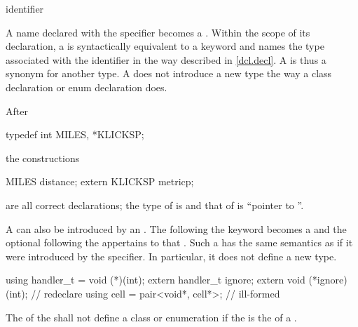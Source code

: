 \begin{bnf}
\br
    identifier
\end{bnf}

A name declared with the  specifier becomes a
. Within the scope of its declaration, a
 is syntactically equivalent to a keyword and
names the type associated with the identifier in the way described in
\ref{dcl.decl}.
%
%
%
A  is thus a synonym for another type. A
 does not introduce a new type the way a class
declaration or enum declaration does.
\begin{example}
%
After

\begin{codeblock}
typedef int MILES, *KLICKSP;
\end{codeblock}

the constructions

\begin{codeblock}
MILES distance;
extern KLICKSP metricp;
\end{codeblock}

are all correct declarations; the type of  is
 and that of  is ``pointer to ''.
\end{example}

\pnum
A  can also be introduced by an
. The  following the
 keyword becomes a 
and the optional  following the
 appertains to that .
Such a  has the same
semantics as if it were introduced by the  specifier. In
particular, it does not define a new type.
\begin{example}

\begin{codeblock}
using handler_t = void (*)(int);
extern handler_t ignore;
extern void (*ignore)(int);         // redeclare 
using cell = pair<void*, cell*>;    // ill-formed
\end{codeblock}

\end{example}
The 
of the  shall not define
a class or enumeration if the 
is the  of a .


